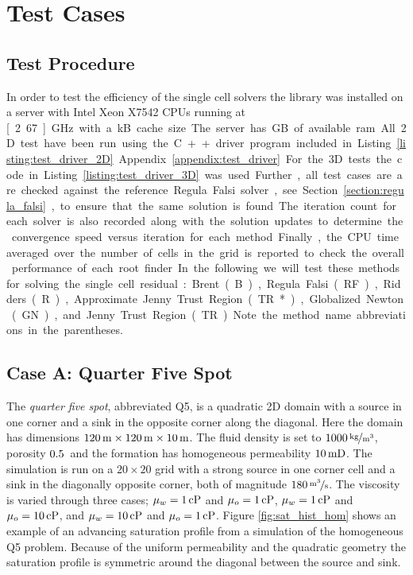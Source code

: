 \section{Test Cases}
\label{section:test_cases}
\subsection{Test Procedure}
\label{section:test_procedure}
In order to test the efficiency of the single cell solvers the \opm library was installed on a server with Intel\textregistered{}  Xeon\textregistered{}  X7542 CPUs running at \unit[2.67]{GHz} with a \unit[18432]{kB} cache size. The server has \unit[252]{GB} of available ram. All 2D test have been run using the C++ driver program included in Listing \ref{listing:test_driver_2D} Appendix \ref{appendix:test_driver}. For the 3D tests the code in Listing \ref{listing:test_driver_3D} was used. Further, all test cases are are checked against the reference Regula Falsi solver, see Section \ref{section:regula_falsi}, to ensure that the same solution is found. The iteration count for each solver is also recorded along with the solution updates to determine the  convergence speed versus iteration for each method. Finally, the CPU time averaged over the number of cells in the grid is reported to check the overall performance of each root finder. In the following we will test these methods for solving the single cell residual: Brent (B), Regula Falsi (RF), Ridders (R), Approximate Jenny Trust Region (TR*),  Globalized Newton (GN), and Jenny Trust Region (TR). Note the method name abbreviations in the parentheses.


\subsection{Case A: Quarter Five Spot}
\label{section:caseA}
The \emph{quarter five spot}, abbreviated Q5, is a quadratic 2D domain with a source in one corner and a sink in the opposite corner along the diagonal. Here the domain has dimensions $\unit[120]{m}\times\unit[120]{m}\times\unit[10]{m}$. The fluid density is set to $\unitfrac[1000]{kg}{m^3}$, porosity $\unit[0.5]{}$ and the formation has homogeneous permeability $\unit[10]{mD}$. The simulation is run on a $20\times 20$ grid with a strong source in one corner cell and a sink in the diagonally opposite corner, both of magnitude $\unitfrac[180]{m^3}{s}$. The viscosity is varied through three cases; $\mu_w = \unit[1]{cP}$ and $\mu_o= \unit[1]{cP}$, $\mu_w = \unit[1]{cP}$ and $\mu_o= \unit[10]{cP}$, and $\mu_w = \unit[10]{cP}$ and $\mu_o= \unit[1]{cP}$. Figure \ref{fig:sat_hist_hom} shows an example of an advancing saturation profile from a simulation of the homogeneous Q5 problem. Because of the uniform permeability and the quadratic geometry the saturation profile is symmetric around the diagonal between the source and sink.

